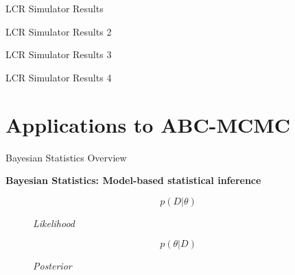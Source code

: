 \documentclass{beamer}
\begin{document}
	\begin{frame}{LCR Simulator Results}
		
	\end{frame}

	\begin{frame}{LCR Simulator Results 2}
		
	\end{frame}

	\begin{frame}{LCR Simulator Results 3}
		
	\end{frame}

	\begin{frame}{LCR Simulator Results 4}
		
	\end{frame}
	
	\section{Applications to ABC-MCMC}
	\begin{frame}{Bayesian Statistics Overview}
	
	\textbf{Bayesian Statistics: Model-based statistical inference}
	
	\begin{figure}
		
		\begin{equation} \tag{1}
			p(D|\theta)
		\end{equation}
	\caption{\textit{Likelihood}} \pause
	
		\begin{equation} \tag{2}
			p(\theta|D)
		\end{equation}
	\caption{\textit{Posterior}}
	
	\end{figure}
	
	\end{frame}
\end{document}
